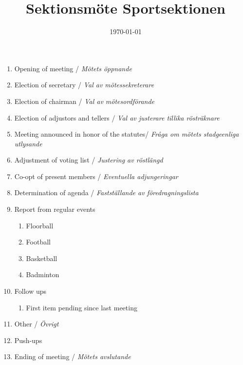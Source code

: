 \documentclass[12pt,a4paper]{article}
\begin{document}
	\title{\Huge Sektionsmöte Sportsektionen}
	\date{\today}
	\maketitle

	\null
	\vfill

	\clearpage

	\begin{enumerate}

		\item Opening of meeting / \emph{Mötets öppnande}
		\item Election of secretary / \emph{Val av mötessekreterare}
		\item Election of chairman / \emph{Val av mötesordförande}
		\item Election of adjustors and tellers / \emph{Val av justerare tillika rösträknare}
		\item Meeting announced in honor of the statutes/ \emph{Fråga om mötets stadgeenliga utlysande}
		\item Adjustment of voting list / \emph{Justering av röstlängd}
		\item Co-opt of present members / \emph{Eventuella adjungeringar}
		\item Determination of agenda / \emph{Fastställande av föredragningslista}
		\item Report from regular events
		\begin{enumerate}
			\item Floorball
			\item Football
			\item Basketball
			\item Badminton
		\end{enumerate}
		\item Follow ups %
		\begin{enumerate}
			\item First item pending since last meeting
		\end{enumerate}
		\item Other / \emph{Övrigt}
		\item Push-ups
		\item Ending of meeting / \emph{Mötets avslutande}
	\end{enumerate}
\end{document}
